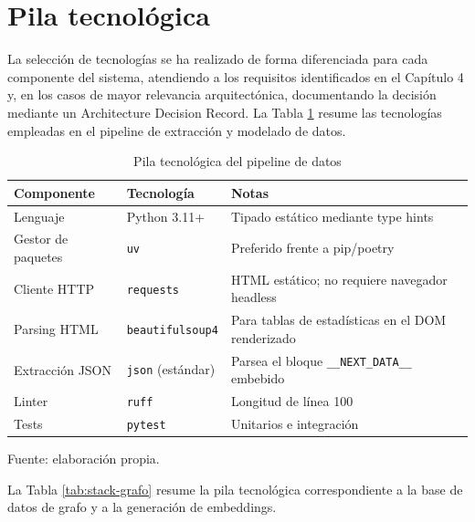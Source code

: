 \documentclass[11pt,a4paper,spanish]{book}
\numberwithin{equation}{chapter}
\numberwithin{figure}{chapter}
\numberwithin{table}{chapter}
\begin{document}
\section{Pila tecnológica}

La selección de tecnologías se ha realizado de forma diferenciada para cada componente del sistema, atendiendo a los requisitos identificados en el Capítulo 4 y, en los casos de mayor relevancia arquitectónica, documentando la decisión mediante un Architecture Decision Record. La Tabla \ref{tab:stack-pipeline} resume las tecnologías empleadas en el pipeline de extracción y modelado de datos.

\begin{table}[h]
\centering
\begin{tabular}{|p{3.3cm}|p{3.3cm}|p{5.7cm}|}
	\hline
	\textbf{Componente} & \textbf{Tecnología} & \textbf{Notas} \\
	\hline
	Lenguaje & Python 3.11+ & Tipado estático mediante type hints \\
	\hline
	Gestor de paquetes & \texttt{uv} & Preferido frente a pip/poetry \\
	\hline
	Cliente HTTP & \texttt{requests} & HTML estático; no requiere navegador headless \\
	\hline
	Parsing HTML & \texttt{beautifulsoup4} & Para tablas de estadísticas en el DOM renderizado \\
	\hline
	Extracción JSON & \texttt{json} (estándar) & Parsea el bloque \texttt{\_\_NEXT\_DATA\_\_} embebido \\
	\hline
	Linter & \texttt{ruff} & Longitud de línea 100 \\
	\hline
	Tests & \texttt{pytest} & Unitarios e integración \\
	\hline
\end{tabular}
\caption{Pila tecnológica del pipeline de datos}
\label{tab:stack-pipeline}
{\footnotesize\centering Fuente: elaboración propia.\par}
\end{table}

La Tabla \ref{tab:stack-grafo} resume la pila tecnológica correspondiente a la base de datos de grafo y a la generación de embeddings.
\end{document}
